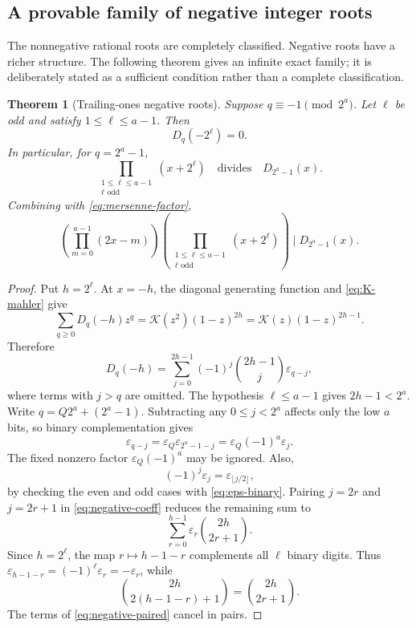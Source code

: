 \documentclass[11pt]{article}
\newtheorem{theorem}{Theorem}[section]
\theoremstyle{definition}
\theoremstyle{remark}
\newcommand{\eps}{\varepsilon}
\newcommand{\K}{\mathcal K}
\newcommand{\Diag}{D}
\begin{document}
\subsection{A provable family of negative integer roots}

The nonnegative rational roots are completely classified.  Negative roots
have a richer structure.  The following theorem gives an infinite exact
family; it is deliberately stated as a sufficient condition rather than a
complete classification.

\begin{theorem}[Trailing-ones negative roots]\label{thm:negative-family}
Suppose \(q\equiv-1\pmod{2^a}\).  Let \(\ell\) be odd and satisfy
\(1\leq\ell\leq a-1\).  Then
\begin{equation}
 \Diag_q(-2^\ell)=0.                                       \label{eq:negative-family}
\end{equation}
In particular, for \(q=2^a-1\),
\begin{equation}
 \prod_{\substack{1\leq\ell\leq a-1\\\ell\text{ odd}}}
 (x+2^\ell)
 \quad\text{divides}\quad \Diag_{2^a-1}(x).               \label{eq:negative-mersenne-factor}
\end{equation}
Combining with \cref{eq:mersenne-factor},
\begin{equation}
 \left(\prod_{m=0}^{a-1}(2x-m)\right)
 \left(\prod_{\substack{1\leq\ell\leq a-1\\\ell\text{ odd}}}
 (x+2^\ell)\right)
 \mid\Diag_{2^a-1}(x).                                    \label{eq:combined-mersenne-factor}
\end{equation}
\end{theorem}

\begin{proof}
Put \(h=2^\ell\).  At \(x=-h\), the diagonal generating function and
\cref{eq:K-mahler} give
\[
 \sum_{q\geq0}\Diag_q(-h)z^q
 =\K(z^2)(1-z)^{2h}
 =\K(z)(1-z)^{2h-1}.
\]
Therefore
\begin{equation}
 \Diag_q(-h)=\sum_{j=0}^{2h-1}
 (-1)^j\binom{2h-1}{j}\eps_{q-j},                         \label{eq:negative-coeff}
\end{equation}
where terms with \(j>q\) are omitted.  The hypothesis
\(\ell\leq a-1\) gives \(2h-1<2^a\).  Write
\(q=Q2^a+(2^a-1)\).  Subtracting any \(0\leq j<2^a\) affects only the low
\(a\) bits, so binary complementation gives
\[
 \eps_{q-j}=\eps_Q\eps_{2^a-1-j}
 =\eps_Q(-1)^a\eps_j.
\]
The fixed nonzero factor \(\eps_Q(-1)^a\) may be ignored.  Also,
\[
 (-1)^j\eps_j=\eps_{\lfloor j/2\rfloor},
\]
by checking the even and odd cases with \cref{eq:eps-binary}.  Pairing
\(j=2r\) and \(j=2r+1\) in \cref{eq:negative-coeff} reduces the remaining
sum to
\begin{equation}
 \sum_{r=0}^{h-1}\eps_r\binom{2h}{2r+1}.                  \label{eq:negative-paired}
\end{equation}
Since \(h=2^\ell\), the map \(r\mapsto h-1-r\) complements all \(\ell\)
binary digits.  Thus
\(\eps_{h-1-r}=(-1)^\ell\eps_r=-\eps_r\), while
\[
 \binom{2h}{2(h-1-r)+1}=\binom{2h}{2r+1}.
\]
The terms of \cref{eq:negative-paired} cancel in pairs.
\end{proof}
\end{document}
